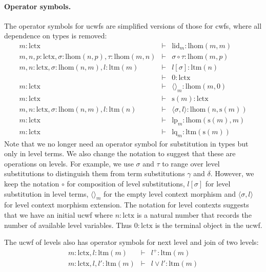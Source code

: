 \documentclass[11pt,a4paper]{article}
\theoremstyle{plain}
\theoremstyle{definition}
\def\lhom{\mathrm{lhom}}
\def\lctx{\mathrm{lctx}}
\def\ltm{\mathrm{ltm}}
\def\lp{\mathrm{lp}}
\def\lq{\mathrm{lq}}
\def\s{\mathrm{s}}
\def\lid{\mathrm{lid}}
\def\cp{\mathrm{cp}}
\def\cq{\mathrm{cq}}
\newcommand{\tuple}[1]{\langle #1 \rangle}
\begin{document}
\paragraph{Operator symbols.} The operator symbols for ucwfs are simplified versions of those for cwfs, where all dependence on types is removed:
\begin{eqnarray*}
m : \lctx &\vdash& \lid_m : \lhom(m,m)\\
m, n, p : \lctx, \sigma : \lhom(n,p), \tau : \lhom(m,n) &\vdash&
\sigma \circ \tau : \lhom(m,p)\\
m,n: \lctx, \sigma : \lhom(n,m), l :\ltm(m) &\vdash&  l[\sigma] : \ltm(n)\\
&\vdash& 0 : \lctx\\
m : \lctx &\vdash& \tuple{}_m : \lhom(m,0)\\
m : \lctx &\vdash& \s(m) : \lctx\\
m,n : \lctx, \sigma : \lhom(n,m), l:\ltm(n) &\vdash& \tuple{\sigma,l} : \lhom(n,\s(m))\\
m : \lctx &\vdash& \lp_m: \lhom(\s(m),m)\\
m : \lctx &\vdash& \lq_m: \ltm(\s(m))
\end{eqnarray*}
Note that we no longer need an operator symbol for substitution in types but only in level terms. We also change the notation to suggest that these are operations on levels. For example, we use $\sigma$ and $\tau$ to range over level substitutions to distinguish them from term substitutions $\gamma$ and $\delta$. However, we keep the notation $\circ$ for composition of level substitutions, $l[\sigma]$ for level substitution in level terms, $\tuple{}_m$ for the empty level context morphism and $\tuple{\sigma,l}$ for level context morphism extension. The notation for level contexts suggests that we have an initial ucwf where $n : \lctx$ is a natural number that records the number of available level variables. Thus $0 : \lctx$ is the terminal object in the ucwf.

The ucwf of levels also has operator symbols for next level and join of two levels:
\begin{eqnarray*}
m : \lctx, l : \ltm(m) &\vdash& l^+ : \ltm(m)\\
m : \lctx, l,l' : \ltm(m) &\vdash& l \vee l' : \ltm(m)
\end{eqnarray*}
\end{document}
